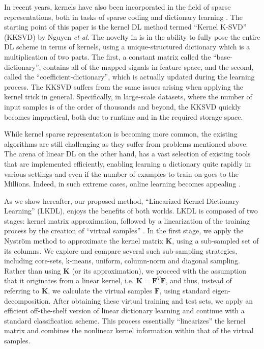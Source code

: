\documentclass[journal]{IEEEtran}
\newcommand{\bK}{\mathbf{K}}
\newcommand{\bF}{\mathbf{F}}
\begin{document}
In recent years, kernels have also been incorporated in the field of sparse representations, both in tasks of sparse coding \cite{KMP,KBP,KSR,KernelOMP,KernelSRC1,KernelSRC2,KernelSRC3} and dictionary learning \cite{KDL,KSR,SPSDKDL,KDL2,KernelizedDL,KDL3}. The starting point of this paper is the kernel DL method termed ``Kernel K-SVD'' (KKSVD) by Nguyen \textit{et al}.
The novelty in \cite{KDL} is in the ability to fully pose the entire DL scheme in terms of kernels, using a unique-structured dictionary which is a multiplication of two parts. The first, a constant matrix called the ``base-dictionary'', contains all of the mapped signals in feature space, and the second, called the ``coefficient-dictionary'', which is actually updated during the learning process.
The KKSVD suffers from the same issues arising when applying the kernel trick in general. Specifically, in large-scale datasets, where the number of input samples is of the order of thousands and beyond, the KKSVD quickly becomes impractical, both due to runtime and in the required storage space.

While kernel sparse representation is becoming more common, the existing algorithms are still challenging as they suffer from problems mentioned above. The arena of linear DL on the other hand, has a vast selection of existing tools that are implemented efficiently, enabling learning a dictionary quite rapidly in various settings and even if the number of examples to train on goes to the Millions. Indeed, in such extreme cases, online learning becomes appealing \cite{OnlineDic,OnlineDic2}.

As we show hereafter, our proposed method, ``Linearized Kernel Dictionary Learning'' (LKDL), enjoys the benefits of both worlds.
LKDL is composed of two stages: kernel matrix approximation, followed by a linearization of the training process by the creation of ``virtual samples'' \cite{LinearizedKSVM}. In the first stage, we apply the Nystr\"{o}m method to approximate the kernel matrix $\bK$, using a sub-sampled set of its columns. We explore and compare several such sub-sampling strategies, including core-sets, k-means, uniform, column-norm and diagonal sampling. Rather than using $\bK$ (or its approximation), we proceed with the assumption that it originates from a linear kernel, i.e. $\bK=\bF^T\bF$, and thus, instead of referring to $\bK$, we calculate the virtual samples $\bF$, using standard eigen-decomposition. After obtaining these virtual training and test sets, we apply an efficient off-the-shelf version of linear dictionary learning and continue with a standard classification scheme. This process essentially ``linearizes'' the kernel matrix and combines the nonlinear kernel information within that of the virtual samples.
\end{document}
